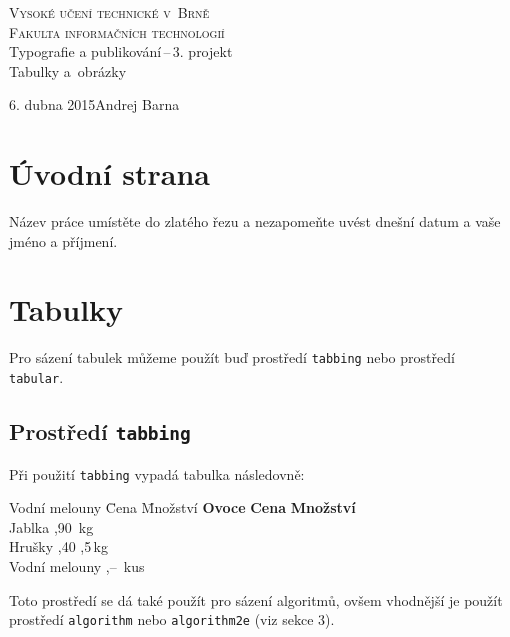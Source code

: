 \documentclass[11pt,a4paper]{article}
\begin{document}
\begin{titlepage}
\begin{center}
\Huge
\textsc{Vysoké učení technické v~Brně\\
\huge Fakulta informačních technologií}\\
\LARGE Typografie a publikování\,--\,3. projekt\\
\Huge Tabulky a~obrázky
\end{center}
\Large 6. dubna 2015\hfill Andrej Barna
\end{titlepage}


\section{Úvodní strana}
Název práce umístěte do zlatého řezu a nezapomeňte uvést dnešní datum a vaše jméno a příjmení.

\section{Tabulky}
Pro sázení tabulek můžeme použít buď prostředí \texttt{tabbing} nebo prostředí \texttt{tabular}.

\subsection{Prostředí \texttt{tabbing}}
Při použití \texttt{tabbing} vypadá tabulka následovně:

\begin{tabbing}
Vodní melouny \quad \= Cena \quad \= Množství\kill
\textbf{Ovoce} \> \textbf{Cena} \> \textbf{Množství}\\
Jablka ,90 \,kg \\
Hrušky ,40 ,5\,kg \\
Vodní melouny ,-- \,kus \\
\end{tabbing}
Toto prostředí se dá také použít pro sázení algoritmů, ovšem vhodnější je použít prostředí \texttt{algorithm} nebo \texttt{algorithm2e} (viz sekce 3).
\end{document}
